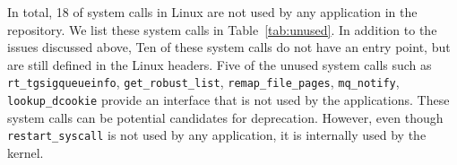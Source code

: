 






In total, 18 of \syscallnum{} system calls in Linux  are not used by any application in the \osdist{} repository. We list these system calls in Table~\ref{tab:unused}.
In addition to the issues discussed above,
Ten of these system calls do not have an entry point, but are still defined in the Linux headers.
Five of the unused system calls such as {\tt rt\_tgsig\linebreak[0]queueinfo}, {\tt get\_robust\_list}, {\tt remap\_\linebreak[0]file\_pages}, {\tt mq\_notify}, {\tt lookup\_dcookie} provide an interface that is not used by the applications. These system calls can be potential candidates for deprecation.
However, even though {\tt restart\_\linebreak[0]syscall} is not used by any application, it is internally used by the kernel. %

